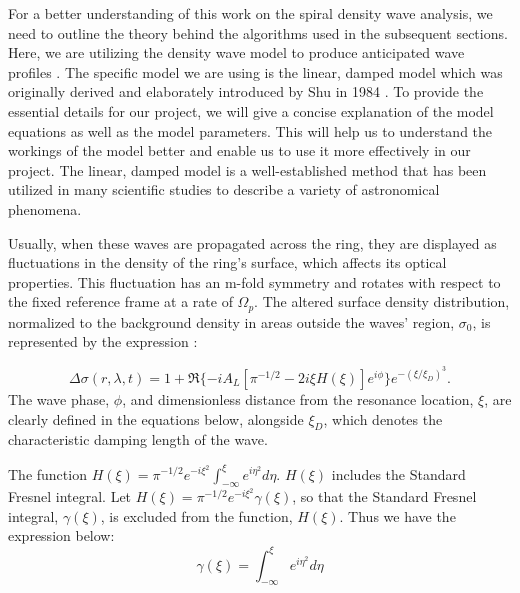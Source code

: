 \documentclass[conference]{IEEEtran}
\begin{document}
For a better understanding of this work on the spiral density wave analysis, we need to outline the theory behind the algorithms used in the subsequent sections.
Here, we are utilizing the density wave model to produce anticipated wave profiles \cite{Nicholson1990AnAR}. The specific model we are using is the linear, damped model which was originally derived and elaborately introduced by Shu in 1984 \cite{article}. To provide the essential details for our project, we will give a concise explanation of the model equations as well as the model parameters. This will help us to understand the workings of the model better and enable us to use it more effectively in our project. The linear, damped model is a well-established method that has been utilized in many scientific studies to describe a variety of astronomical phenomena.


Usually, when these waves are propagated across the ring, they are displayed as fluctuations in the density of the ring's surface, which affects its optical properties. This fluctuation has an m-fold symmetry and rotates with respect to the fixed reference frame at a rate of $\Omega_{p}$. The altered surface density distribution, normalized to the background density in areas outside the waves' region, $\sigma_{0}$, is represented by the expression \cite{Nicholson1990AnAR}:

\vspace{2pt}

\begin{equation}
\Delta \sigma(r,\lambda,t) = 1 + \Re\{-iA_{L}[\pi^{-1/2}-2i\xi H(\xi)]e^{i\phi}\}e^{-(\xi /\xi_{D})^{3}}.
\end{equation}
The wave phase, $\phi$, and dimensionless distance from the resonance location, $\xi$, are clearly defined in the equations below, alongside $\xi_{D}$, which denotes the characteristic damping length of the wave. 

\vspace{2pt}

The function $H(\xi) = \pi^{-1/2}e^{-i\xi^{2}}\int_{-\infty}^{\xi}e^{i\eta^{2}}d\eta$. $H(\xi)$ includes the Standard Fresnel integral. Let $H(\xi) = \pi^{-1/2}e^{-i\xi^{2}}\gamma(\xi)$, so that the Standard Fresnel integral, $\gamma(\xi)$, is excluded from the function, $H(\xi)$. Thus we have the expression below:
\begin{equation}
    \gamma(\xi) = \int_{-\infty}^{\xi}e^{i\eta^{2}}d\eta
\end{equation}
\end{document}
